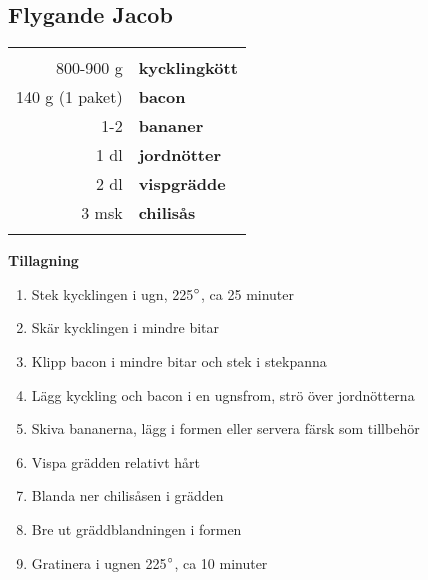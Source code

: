 \clearpage

\subsection{Flygande Jacob}

\begin{table}[H]
	\begin{tabular}{rl}
	\hline
	&\\
		800-900 g & \textbf{kycklingkött}\\
		140 g (1 paket) & \textbf{bacon}\\
		1-2 & \textbf{bananer}\\
		1 dl & \textbf{jordnötter}\\
		2 dl & \textbf{vispgrädde}\\
		3 msk & \textbf{chilisås}\\
	&\\
	\hline
	\end{tabular}
\end{table}


\begin{multicols*}{2}

\noindent \textbf{Tillagning}
\begin{enumerate}
	\itemsep0cm
	\item Stek kycklingen i ugn, 225$\degree$, ca 25 minuter
	\item Skär kycklingen i mindre bitar
	\item Klipp bacon i mindre bitar och stek i stekpanna
	\item Lägg kyckling och bacon i en ugnsfrom, strö över \mbox{jordnötterna}
	\item Skiva bananerna, lägg i formen eller servera färsk som tillbehör
	\item Vispa grädden relativt hårt
	\item Blanda ner chilisåsen i grädden
	\item Bre ut gräddblandningen i \mbox{formen}
	\item Gratinera i ugnen 225$\degree$, ca 10 minuter
\end{enumerate}

\end{multicols*}

\clearpage